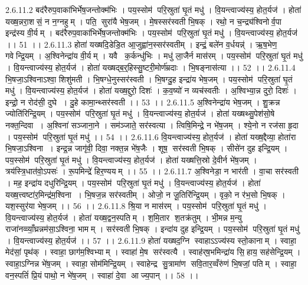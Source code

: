 2.6.11.2
बद॑रैरुप॒वाका॑भिर्भेष॒जन्तोक्म॑भिः । पय॒स्सोम॑ परि॒स्रुता॑ घृ॒तं मधु॑ । वि॒यन्त्वाज्य॑स्य॒ होत॒र्यज॑ । होता॑ यख्ष॒न्नरा॒शसं॒ न न॒ग्नहुम् । पति॒॒ सुरा॑यै भेष॒जम् । मे॒षस्सर॑स्वती भि॒षक् । रथो॒ न च॒न्द्र्य॑श्विनोर्व॒पा इन्द्र॑स्य वी॒र्यम् । बद॑रैरुप॒वाका॑भिर्भेष॒जन्तोक्म॑भिः । पय॒स्सोम॑ परि॒स्रुता॑ घृ॒तं मधु॑ । वि॒यन्त्वाज्य॑स्य॒ होत॒र्यज॑ ।। 51 ।।
2.6.11.3
होता॑ यख्षदि॒डेडि॒त आ॒जुह्वा॑न॒स्सर॑स्वतीम् । इन्द्रं॒ बले॑न व॒र्धयन्न्॑ । ऋ॒ष॒भेण॒ गवेन्द्रि॒यम् । अ॒श्विनेन्द्रा॑य वी॒र्यम् । यवै क॒र्कन्धु॑भिः । मधु॑ ला॒जैर्न मास॑रम् । पय॒स्सोम॑ परि॒स्रुता॑ घृ॒तं मधु॑ । वि॒यन्त्वाज्य॑स्य॒ होत॒र्यज॑ । होता॑ यख्षद्ब॒र्॒हिस्सु॒ष्टरी॒मोर्ण॑म्रदाः । भि॒षङ्नास॑त्या ।। 52 ।।
2.6.11.4
भि॒षजा॒ऽश्विनाऽश्वा॒ शिशु॑मती । भि॒षग्धे॒नुस्सर॑स्वती । भि॒षग्दु॒ह इन्द्रा॑य भेष॒जम् । पय॒स्सोम॑ परि॒स्रुता॑ घृ॒तं मधु॑ । वि॒यन्त्वाज्य॑स्य॒ होत॒र्यज॑ । होता॑ यख्ष॒द्दुरो॒ दिशः॑ । क॒व॒ष्यो॑ न व्यच॑स्वतीः । अ॒श्विभ्या॒न्न दुरो॒ दिशः॑ । इन्द्रो॒ न रोद॑सी॒ दुघे । दु॒हे कामा॒न्थ्सर॑स्वती ।। 53 ।।
2.6.11.5
अ॒श्विनेन्द्रा॑य भेष॒जम् । शु॒क्रन्न ज्योति॑रिन्द्रि॒यम् । पय॒स्सोम॑ परि॒स्रुता॑ घृ॒तं मधु॑ । वि॒यन्त्वाज्य॑स्य॒ होत॒र्यज॑ । होता॑ यख्षथ्सु॒पेश॑सो॒षे नक्त॒न्दिवा । अ॒श्विना॑ सञ्जाना॒ने । सम॑ञ्जाते॒ सर॑स्वत्या । त्विषि॒मिन्द्रे॒ न भे॑ष॒जम् । श्ये॒नो न रज॑सा हृ॒दा । पय॒स्सोम॑ परि॒स्रुता॑ घृ॒तं मधु॑ ।। 54 ।।
2.6.11.6
वि॒यन्त्वाज्य॑स्य॒ होत॒र्यज॑ । होता॑ यख्ष॒द्दैव्या॒ होता॑रा भि॒षजा॒ऽश्विना । इन्द्र॒न्न जागृ॑वी॒ दिवा॒ नक्त॒न्न भे॑ष॒जैः । शूष॒॒ सर॑स्वती भि॒षक् । सीसे॑न दुह इन्द्रि॒यम् । पय॒स्सोम॑ परि॒स्रुता॑ घृ॒तं मधु॑ । वि॒यन्त्वाज्य॑स्य॒ होत॒र्यज॑ । होता॑ यख्षत्ति॒स्रो दे॒वीर्न भे॑ष॒जम् । त्रय॑स्त्रि॒धात॑वो॒ऽपसः॑ । रू॒पमिन्द्रे॑ हिर॒ण्ययम् ।। 55 ।।
2.6.11.7
अ॒श्विनेडा॒ न भार॑ती । वा॒चा सर॑स्वती । मह॒ इन्द्रा॑य दधुरिन्द्रि॒यम् । पय॒स्सोम॑ परि॒स्रुता॑ घृ॒तं मधु॑ । वि॒यन्त्वाज्य॑स्य॒ होत॒र्यज॑ । होता॑ यख्ष॒त्त्वष्टा॑र॒मिन्द्र॑म॒श्विना । भि॒षज॒न्न सर॑स्वतीम् । ओजो॒ न जू॒तिरि॑न्द्रि॒यम् । वृको॒ न र॑भ॒सो भि॒षक् । यश॒स्सुर॑या भेष॒जम् ।। 56 ।।
2.6.11.8
श्रि॒या न मास॑रम् । पय॒स्सोम॑ परि॒स्रुता॑ घृ॒तं मधु॑ । वि॒यन्त्वाज्य॑स्य॒ होत॒र्यज॑ । होता॑ यख्ष॒द्वन॒स्पतिम् । श॒मि॒तार॑ श॒तक्र॑तुम् । भी॒मन्न म॒न्यु राजा॑नव्व्याँ॒घ्रन्नम॑सा॒ऽश्विना॒ भामम् । सर॑स्वती भि॒षक् । इन्दा॑य दुह इन्द्रि॒यम् । पय॒स्सोम॑ परि॒स्रुता॑ घृ॒तं मधु॑ । वि॒यन्त्वाज्य॑स्य॒ होत॒र्यज॑ ।। 57 ।।
2.6.11.9
होता॑ यख्षद॒ग्नि स्वाहाऽऽज्य॑स्य स्तो॒कानाम् । स्वाहा॒ मेद॑सां॒ पृथ॑क् । स्वाहा॒ छाग॑म॒श्विभ्याम् । स्वाहा॑ मे॒ष सर॑स्वत्यै । स्वाह॑र्‌ष॒भमिन्द्रा॑य सि॒॒हाय॒ सह॑सेन्द्रि॒यम् । स्वाहा॒ऽग्निन्न भे॑ष॒जम् । स्वाहा॒ सोम॑मिन्द्रि॒यम् । स्वाहेन्द्र॑ सु॒त्रामा॑ण सवि॒तार॒व्वँरु॑णं भि॒षजां॒ पतिम् । स्वाहा॒ वन॒स्पतिं॑ प्रि॒यं पाथो॒ न भे॑ष॒जम् । स्वाहा॑ दे॒वा आज्य॒पान् ।। 58 ।।
